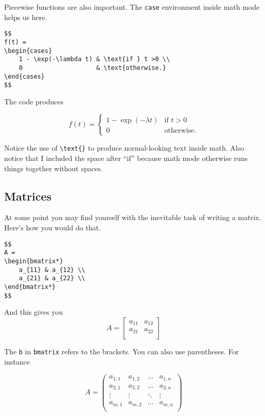 Piecewise functions are also important. The \texttt{case} environment inside math mode helps us here.

\begin{lstlisting}
$$
f(t) =
\begin{cases}
	1 - \exp(-\lambda t) & \text{if } t >0 \\
	0                    & \text{otherwise.}
\end{cases}
$$
\end{lstlisting}

The code produces

$$
f(t) =
\begin{cases}
	1 - \exp(-\lambda t) & \text{if } t >0 \\
	0                    & \text{otherwise.}
\end{cases}
$$

Notice the use of \verb|\text{}| to produce normal-looking text inside math. Also notice that I included the space after ``if'' because math mode otherwise runs things together without spaces.

\subsection{Matrices}

At some point you may find yourself with the inevitable task of writing a matrix. Here's how you would do that.

\begin{lstlisting}
$$
A =
\begin{bmatrix*}
	a_{11} & a_{12} \\
	a_{21} & a_{22} \\
\end{bmatrix*}
$$
\end{lstlisting}

And this gives you 
$$
A =
\begin{bmatrix*}
a_{11} & a_{12} \\
a_{21} & a_{22} \\
\end{bmatrix*}
$$

The \texttt{b} in \texttt{bmatrix} refers to the brackets. You can also use parentheses. For instance

$$
A =
\begin{pmatrix}
	a_{1,1} & a_{1,2} & \ldots & a_{1,n} \\
	a_{2,1} & a_{2,2} & \ldots & a_{2,n} \\
	\vdots & \vdots   & \ddots & \vdots \\
	a_{m,1} & a_{m,2} & \ldots & a_{m,n}  \\
\end{pmatrix}
$$

